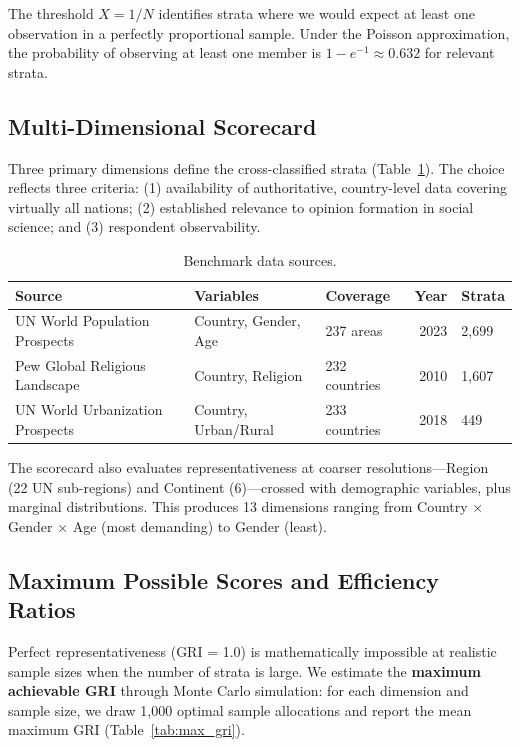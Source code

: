 \documentclass[11pt,a4paper]{article}
\begin{document}
The threshold $X = 1/N$ identifies strata where we would expect at least one observation in a perfectly proportional sample. Under the Poisson approximation, the probability of observing at least one member is $1 - e^{-1} \approx 0.632$ for relevant strata.

\subsection{Multi-Dimensional Scorecard}

Three primary dimensions define the cross-classified strata (Table~\ref{tab:benchmarks}). The choice reflects three criteria: (1) availability of authoritative, country-level data covering virtually all nations; (2) established relevance to opinion formation in social science; and (3) respondent observability.

\begin{table}[ht]
\centering
\caption{Benchmark data sources.}
\label{tab:benchmarks}
\begin{tabular}{@{}lllrl@{}}
\toprule
Source & Variables & Coverage & Year & Strata \\
\midrule
UN World Population Prospects & Country, Gender, Age & 237 areas & 2023 & 2,699 \\
Pew Global Religious Landscape & Country, Religion & 232 countries & 2010 & 1,607 \\
UN World Urbanization Prospects & Country, Urban/Rural & 233 countries & 2018 & 449 \\
\bottomrule
\end{tabular}
\end{table}

The scorecard also evaluates representativeness at coarser resolutions---Region (22 UN sub-regions) and Continent (6)---crossed with demographic variables, plus marginal distributions. This produces 13 dimensions ranging from Country $\times$ Gender $\times$ Age (most demanding) to Gender (least).

\subsection{Maximum Possible Scores and Efficiency Ratios}

Perfect representativeness (GRI = 1.0) is mathematically impossible at realistic sample sizes when the number of strata is large. We estimate the \textbf{maximum achievable GRI} through Monte Carlo simulation: for each dimension and sample size, we draw 1,000 optimal sample allocations and report the mean maximum GRI (Table~\ref{tab:max_gri}).
\end{document}
